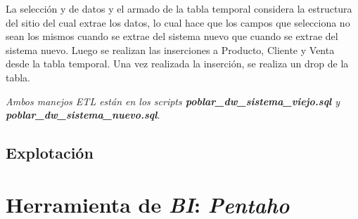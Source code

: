 La selección y de datos y el armado de la tabla temporal considera la estructura del sitio del cual extrae los datos, lo cual hace que los campos que selecciona no sean los mismos cuando se extrae del sistema nuevo que cuando se extrae del sistema nuevo. Luego se realizan las inserciones a Producto, Cliente y Venta desde la tabla temporal. Una vez realizada la inserción, se realiza un drop de la tabla.


\emph{Ambos manejos ETL están en los \emph{scripts} \textbf{poblar\_dw\_sistema\_viejo.sql} y \textbf{poblar\_dw\_sistema\_nuevo.sql}.}

\subsection{Explotación}


\section{Herramienta de \emph{BI}: \emph{Pentaho}}






\clearpage
\printbibliography




